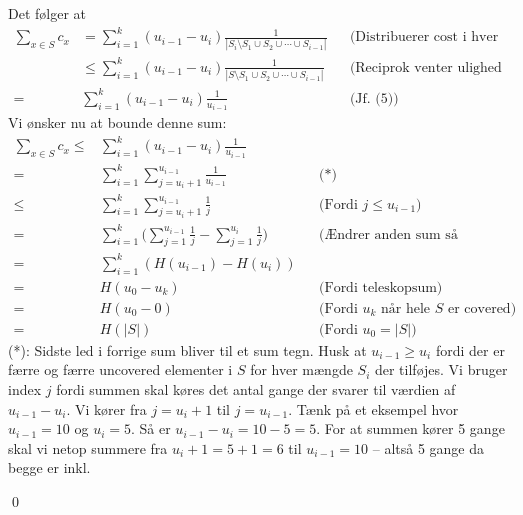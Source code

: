 Det følger at
\begin{align*}
	\sum_{x \in S} c_x &= \sum_{i=1}^k (u_{i-1}-u_i) \frac{1}{|S_i \setminus S_1 \cup S_2 \cup \cdots \cup S_{i-1}|} && \text{(Distribuerer cost i hver iteration)} \\
	&\le  \sum_{i=1}^k (u_{i-1}-u_i) \frac{1}{|S \setminus S_1 \cup S_2 \cup \cdots \cup S_{i-1}|} && \text{(Reciprok venter ulighed fra (5))} \\
	=&  \sum_{i=1}^k (u_{i-1}-u_i) \frac{1}{u_{i-1}} && \text{(Jf. (5)})
\end{align*}
Vi ønsker nu at bounde denne sum: 
\begin{align*}
	\sum_{x \in S} c_x \le& \sum_{i=1}^k (u_{i-1}-u_i) \frac{1}{u_{i-1}} \\
	=& \sum_{i=1}^k \sum_{j=u_i+1}^{u_{i-1}} \frac{1}{u_{i-1}} && \text{(*)} \\
	\le& \sum_{i=1}^k \sum_{j=u_i+1}^{u_{i-1}} \frac{1}{j} && \text{(Fordi } j \le u_{i-1}) \\
	=& \sum_{i=1}^k \bigg(\sum_{j=1}^{u_{i-1}} \frac{1}{j} - \sum_{j=1}^{u_i} \frac{1}{j} \bigg) && \text{(Ændrer anden sum så indexeret fra 1)} \\
	=&  \sum_{i=1}^k (H(u_{i-1})-H(u_i)) \\
	=& H(u_0-u_k) && \text{(Fordi teleskopsum)} \\
	=& H(u_0-0) && \text{(Fordi } u_k \text{ når hele } S \text{ er covered)} \\
	=& H(|S|) && \text{(Fordi } u_0=|S|)
\end{align*}
(*): Sidste led i forrige sum bliver til et sum tegn. Husk at $u_{i-1}\ge u_i$ fordi der er færre og færre uncovered elementer i $S$ for hver mængde $S_i$ der tilføjes. Vi bruger index $j$ fordi summen skal køres det antal gange der svarer til værdien af $u_{i-1}-u_i$. Vi kører fra $j=u_i+1$ til $j=u_{i-1}$. Tænk på et eksempel hvor $u_{i-1}=10$ og $u_{i}=5$. Så er $u_{i-1}-u_i=10-5=5$. For at summen kører 5 gange skal vi netop summere fra $u_i+1=5+1=6$ til $u_{i-1}=10$ -- altså 5 gange da begge er inkl. 
\begin{flushright}
	\qed
\end{flushright}
